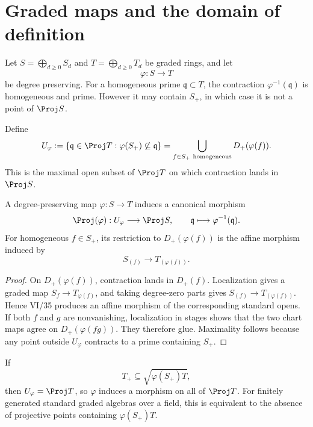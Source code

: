 

\section{Graded maps and the domain of definition}
Let \(S=\bigoplus_{d\ge0}S_d\) and \(T=\bigoplus_{d\ge0}T_d\) be graded rings, and let
\[
  \varphi:S\longrightarrow T
\]
be degree preserving.  For a homogeneous prime \(\mathfrak q\subset T\), the contraction \(\varphi^{-1}(\mathfrak q)\) is homogeneous and prime.  However it may contain \(S_+\), in which case it is not a point of \(\Proj S\).

\begin{definition}\label{def:vi38-domain}
Define
\[
U_\varphi
:=\{\mathfrak q\in\Proj T:\varphi(S_+)\not\subseteq\mathfrak q\}
=\bigcup_{f\in S_+\ \mathrm{homogeneous}}D_+(\varphi(f)).
\]
This is the maximal open subset of \(\Proj T\) on which contraction lands in \(\Proj S\).
\end{definition}

\begin{theorem}\label{thm:vi38-proj-domain-map}
A degree-preserving map \(\varphi:S\to T\) induces a canonical morphism
\[
  \Proj(\varphi):U_\varphi\longrightarrow\Proj S,
  \qquad
  \mathfrak q\longmapsto\varphi^{-1}(\mathfrak q).
\]
For homogeneous \(f\in S_+\), its restriction to \(D_+(\varphi(f))\) is the affine morphism induced by
\[
  S_{(f)}\longrightarrow T_{(\varphi(f))}.
\]
\end{theorem}

\begin{proof}
On \(D_+(\varphi(f))\), contraction lands in \(D_+(f)\).  Localization gives a graded map \(S_f\to T_{\varphi(f)}\), and taking degree-zero parts gives \(S_{(f)}\to T_{(\varphi(f))}\).  Hence VI/35 produces an affine morphism of the corresponding standard opens.  If both \(f\) and \(g\) are nonvanishing, localization in stages shows that the two chart maps agree on \(D_+(\varphi(fg))\).  They therefore glue.  Maximality follows because any point outside \(U_\varphi\) contracts to a prime containing \(S_+\).
\end{proof}

\begin{corollary}\label{cor:vi38-global-criterion}
If
\[
  T_+\subseteq\sqrt{\varphi(S_+)T},
\]
then \(U_\varphi=\Proj T\), so \(\varphi\) induces a morphism on all of \(\Proj T\).  For finitely generated standard graded algebras over a field, this is equivalent to the absence of projective points containing \(\varphi(S_+)T\).
\end{corollary}

